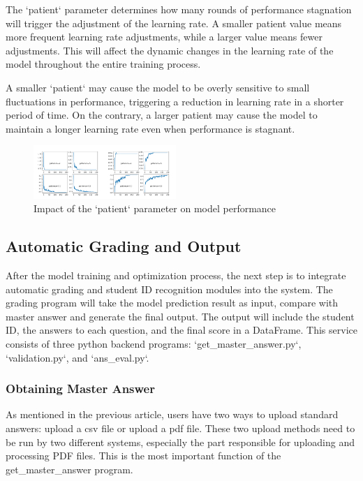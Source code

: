 \documentclass[twocolumn]{article}
\begin{document}
    The `patient` parameter determines how many rounds of performance stagnation will trigger the adjustment of the learning rate. A smaller patient value means more frequent learning rate adjustments, while a larger value means fewer adjustments. This will affect the dynamic changes in the learning rate of the model throughout the entire training process.

    A smaller `patient` may cause the model to be overly sensitive to small fluctuations in performance, triggering a reduction in learning rate in a shorter period of time. On the contrary, a larger patient may cause the model to maintain a longer learning rate even when performance is stagnant.

    \begin{figure}[h]
        \centering
        \includegraphics[width=0.48\textwidth]{patience.jpeg}
        \caption{Impact of the `patient` parameter on model performance}
        \label{fig:patience}
    \end{figure}
    
    \subsection{Automatic Grading and Output}

    After the model training and optimization process, the next step is to integrate automatic grading and student ID recognition modules into the system. The grading program will take the model prediction result as input, compare with master answer and generate the final output. The output will include the student ID, the answers to each question, and the final score in a DataFrame. This service consists of three python backend programs: `get\_master\_answer.py`, `validation.py`, and `ans\_eval.py`.

        \subsubsection{Obtaining Master Answer}
        As mentioned in the previous article, users have two ways to upload standard answers: upload a csv file or upload a pdf file. These two upload methods need to be run by two different systems, especially the part responsible for uploading and processing PDF files. This is the most important function of the get\_master\_answer program.
\end{document}
